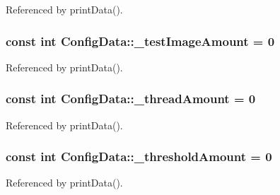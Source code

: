 Referenced by print\+Data().

\subsubsection[{\texorpdfstring{\+\_\+test\+Image\+Amount}{_testImageAmount}}]{\setlength{\rightskip}{0pt plus 5cm}const int Config\+Data\+::\+\_\+test\+Image\+Amount = 0\hspace{0.3cm}{\ttfamily [private]}}\hypertarget{classConfigData_a40355707f3b365a9b83b7530e0de1316}{}\label{classConfigData_a40355707f3b365a9b83b7530e0de1316}


Referenced by print\+Data().

\subsubsection[{\texorpdfstring{\+\_\+thread\+Amount}{_threadAmount}}]{\setlength{\rightskip}{0pt plus 5cm}const int Config\+Data\+::\+\_\+thread\+Amount = 0\hspace{0.3cm}{\ttfamily [private]}}\hypertarget{classConfigData_a349c395a667ed45ff0fc4bd0753e890b}{}\label{classConfigData_a349c395a667ed45ff0fc4bd0753e890b}


Referenced by print\+Data().

\subsubsection[{\texorpdfstring{\+\_\+threshold\+Amount}{_thresholdAmount}}]{\setlength{\rightskip}{0pt plus 5cm}const int Config\+Data\+::\+\_\+threshold\+Amount = 0\hspace{0.3cm}{\ttfamily [private]}}\hypertarget{classConfigData_a1956520556b7b407196a5b4153f6b083}{}\label{classConfigData_a1956520556b7b407196a5b4153f6b083}


Referenced by print\+Data().

